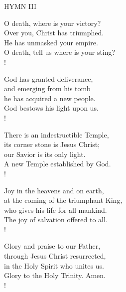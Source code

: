 \noindent\small{\uppercase{Hymn III}}\normalsize\label{easter:lastHymn}
\begin{cverse}
O death, where is your victory?\\
Over you, Christ has triumphed.\\
He has unmasked your empire.\\
O death, tell us where is your sting?\\!

God has granted deliverance, \\
and emerging from his tomb\\
he has acquired a new people.\\
God bestows his light upon us.\\!

There is an indestructible Temple,\\
its corner stone is Jesus Christ;\\
our Savior is its only light.\\
A new Temple established by God.\\!

Joy in the heavens and on earth,\\
at the coming of the triumphant King,\\
who gives his life for all mankind.\\
The joy of salvation offered to all.\\!

Glory and praise to our Father,\\
through Jesus Christ resurrected,\\
in the Holy Spirit who unites us.\\
Glory to the Holy Trinity. Amen.\\!
\end{cverse}
